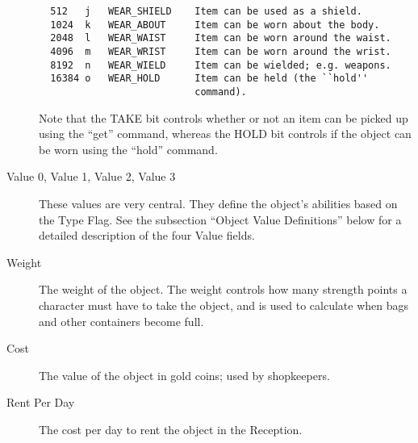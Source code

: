 \documentclass[11pt]{article}
\begin{document}
\begin{description}
\begin{verbatim}
  512   j   WEAR_SHIELD    Item can be used as a shield.
  1024  k   WEAR_ABOUT     Item can be worn about the body.
  2048  l   WEAR_WAIST     Item can be worn around the waist.
  4096  m   WEAR_WRIST     Item can be worn around the wrist.
  8192  n   WEAR_WIELD     Item can be wielded; e.g. weapons.
  16384 o   WEAR_HOLD      Item can be held (the ``hold''
                           command).
\end{verbatim}
Note that the TAKE bit controls whether or not an item can be picked up using the ``get'' command, whereas the HOLD bit controls if the object can be worn using the ``hold'' command.
\item[Value 0, Value 1, Value 2, Value 3] These values are very central.  They define the object's abilities based on the Type Flag.  See the subsection ``Object Value Definitions'' below for a detailed description of the four Value fields.
\item[Weight] The weight of the object.  The weight controls how many strength points a character must have to take the object, and is used to calculate when bags and other containers become full.
\item[Cost] The value of the object in gold coins; used by shopkeepers.
\item[Rent Per Day] The cost per day to rent the object in the Reception.
\end{description}
\end{document}
